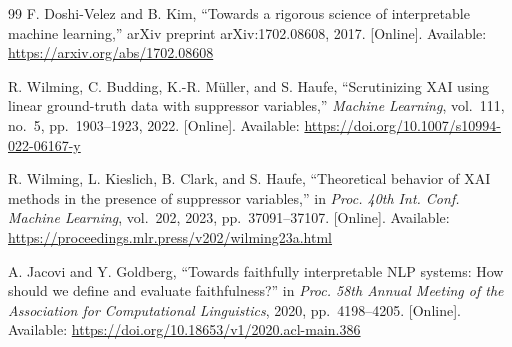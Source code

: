 \documentclass{cleiej}
\begin{document}
\begin{thebibliography}{99}
F. Doshi-Velez and B. Kim, ``Towards a rigorous science of interpretable
machine learning,'' arXiv preprint arXiv:1702.08608, 2017. [Online].
Available: \url{https://arxiv.org/abs/1702.08608}

R. Wilming, C. Budding, K.-R. M\"{u}ller, and S. Haufe, ``Scrutinizing XAI
using linear ground-truth data with suppressor variables,'' \emph{Machine
Learning}, vol.~111, no.~5, pp.~1903--1923, 2022. [Online]. Available:
\url{https://doi.org/10.1007/s10994-022-06167-y}

R. Wilming, L. Kieslich, B. Clark, and S. Haufe, ``Theoretical behavior of
XAI methods in the presence of suppressor variables,'' in \emph{Proc. 40th
Int. Conf. Machine Learning}, vol.~202, 2023, pp.~37091--37107. [Online]. Available:
\url{https://proceedings.mlr.press/v202/wilming23a.html}

A. Jacovi and Y. Goldberg, ``Towards faithfully interpretable NLP systems:
How should we define and evaluate faithfulness?'' in \emph{Proc. 58th
Annual Meeting of the Association for Computational Linguistics}, 2020,
pp.~4198--4205. [Online]. Available:
\url{https://doi.org/10.18653/v1/2020.acl-main.386}

\end{thebibliography}
\end{document}

